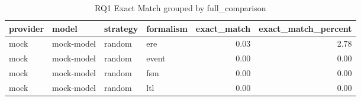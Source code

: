 \begin{table}
\caption{RQ1 Exact Match grouped by full_comparison}
\label{tab:rq1_full_comparison}
\begin{tabular}{llllrr}
\toprule
provider & model & strategy & formalism & exact_match & exact_match_percent \\
\midrule
mock & mock-model & random & ere & 0.03 & 2.78 \\
mock & mock-model & random & event & 0.00 & 0.00 \\
mock & mock-model & random & fsm & 0.00 & 0.00 \\
mock & mock-model & random & ltl & 0.00 & 0.00 \\
\bottomrule
\end{tabular}
\end{table}
